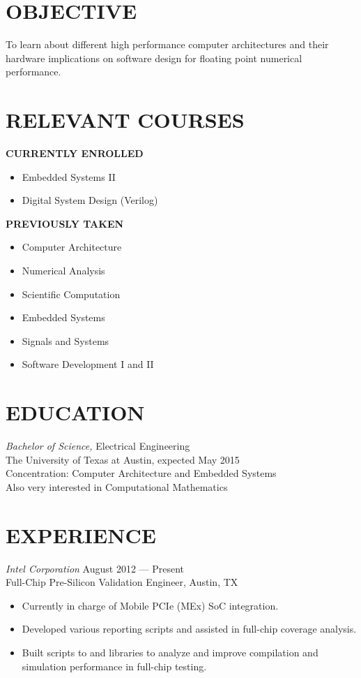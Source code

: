 \documentclass[margin]{res}
\begin{document}
\begin{resume}
  \section{OBJECTIVE} 
  To learn about different high performance computer architectures and
  their hardware implications on software design for floating point
  numerical performance.
  \section{RELEVANT COURSES}
{\footnotesize\textbf{CURRENTLY ENROLLED}}
\vspace{-.75em}
\begin{multicols}{2}
  \begin{itemize}
  \item Embedded Systems II
  \item Digital System Design (Verilog)
  \end{itemize}
\end{multicols}
\vspace{-1.75em}
{\footnotesize\textbf{PREVIOUSLY TAKEN}}
\vspace{-.75em}
  \begin{multicols}{2}
    \begin{itemize}
    \item Computer Architecture
    \item Numerical Analysis
    \item Scientific Computation
    \item Embedded Systems
    \item Signals and Systems
    \item Software Development I and II
    \end{itemize}
  \end{multicols}
  \section{EDUCATION} 
  {\sl Bachelor of Science,} Electrical Engineering \\
  The University of Texas at Austin,
  expected May 2015 \\
  Concentration: Computer Architecture and Embedded Systems\\
  Also very interested in Computational Mathematics

  \section{EXPERIENCE} {\sl Intel Corporation} 
  \hfill August 2012 --- Present \\
  Full-Chip Pre-Silicon Validation Engineer, Austin, TX
  \begin{itemize}
  \item Currently in charge of Mobile PCIe (MEx) SoC integration.
  \item Developed various reporting scripts and assisted in full-chip
    coverage analysis.
  \item Built scripts to and libraries to analyze and improve
    compilation and simulation performance in full-chip testing.
  \end{itemize}


\end{resume}
\end{document}
